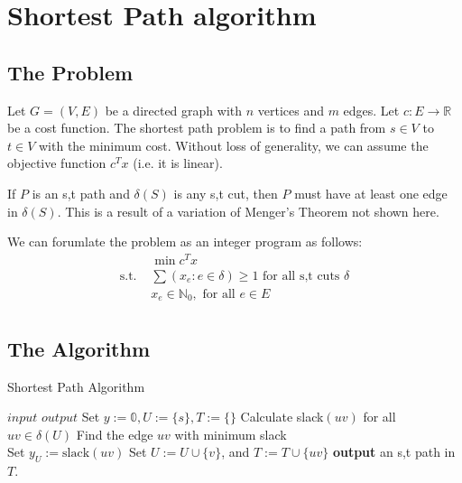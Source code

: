\documentclass[a4paper]{report}
\begin{document}
\section{Shortest Path algorithm}
\subsection{The Problem}
\begin{definition}
  Let $G = (V, E)$ be a directed graph with $n$ vertices and $m$ edges. Let $c : E \rightarrow \mathbb R$ be a cost function. The shortest path problem is to find a path from $s \in V$ to $t \in V$ with the minimum cost. Without loss of generality, we can assume the objective function $c^T x$ (i.e. it is linear).

  \begin{corollary}
    If $P$ is an s,t path and $\delta(S)$ is any s,t cut, then $P$ must have at least one edge in $\delta(S)$. This is a result of a  variation of Menger's Theorem not shown here. 
    \end{corollary}

\end{definition}
We can forumlate the problem as an integer program as follows:
\begin{align*}
  & \min c^T x \\
  \text{s.t. } & \sum (x_e : e \in \delta) \geq 1 \text{ for all s,t cuts } \delta \\
               & x_e \in \mathbb N_{0}, \text{ for all } e \in E \\
\end{align*}

\subsection{The Algorithm}
\begin{algorithm}
  \algrenewcommand{}
  \algrenewcommand{}
  \caption{Shortest Path Algorithm}
  \label{alg:path}
  \begin{algorithmic}[1]
    \Require $input$
    \Ensure $output$
    \State Set $y := \mathbb 0, U := \{s\}, T := \{\}$
      \State Calculate slack$(uv)$ for all $uv \in \delta(U)$ 
      \State Find the edge $uv$ with minimum slack \\ 
      \State Set $y_U := \text{slack}(uv)$
      \State Set $U := U \cup \{v\}$, and $T := T \cup \{uv\}$ 
    \EndWhile {}
    \State \textbf{output} an s,t path in $T$. 
  \end{algorithmic}
\end{algorithm}
\end{document}
